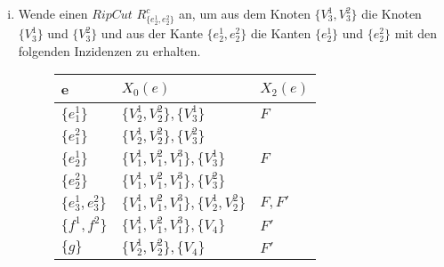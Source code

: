 \documentclass[12pt,titlepage]{article}
\begin{document}
\begin{enumerate}[(i)]

\item Wende einen $Rip Cut$ $R^{c}_{\{e^1_{2},e^2_{2}\}}$ an, um aus dem Knoten $\{V^1_{3},V^2_{3}\}$ die Knoten $\{V^1_{3}\}$ und $\{V^2_{3}\}$ und aus der Kante $\{e^1_{2},e^2_{2}\}$ die Kanten $\{e^1_{2}\}$ und $\{e^2_{2}\}$ mit den folgenden Inzidenzen zu erhalten. 
 \begin{figure}[H]
\begin{center}
\begin{tabularx}{\textwidth}{XXX}
\hline
\textbf{e}&\textbf{$X_0(e)$}&\textbf{$X_2(e)$}\\
 \hline
 $\{e_1^1\}$ & $\{V_2^1,V_2^2\},\{V_3^1\}$& $F$\\
  $\{e_1^2\}$ & $\{V_2^1,V_2^2\},\{V_3^2\}$&\\ 
  $\{e_2^1\}$&$\{V_1^1,V_1^2,V_1^3\},\{V_3^1\}$ & $F$\\
   $\{e_2^2\}$&$\{V_1^1,V_1^2,V_1^3\},\{V_3^2\}$ & \\
  $\{e_3^1,e_3^2\}$&$\{V_1^1,V_1^2,V_1^3\},\{V_2^1,V_2^2\}$ & $F,F'$\\ 
   $\{f^1,f^2\}$&$\{V_1^1,V_1^2,V_1^3\},\{V_4\}$& $F'$\\
   $\{g\}$ & $\{V_2^1,V_2^2\},\{V_4\}$ & $F'$ \\
 \end{tabularx}
\end{center} 
\end{figure}

  \begin{figure}[H]
\begin{tikzpicture}[line cap=round,line join=round,>=triangle 45,x=1.cm,y=1.cm]


\end{tikzpicture}
\end{figure}
\end{enumerate}
\end{document}
